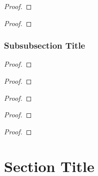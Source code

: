 \begin{thrm}
    \lipsum[1]
\end{thrm}

\begin{proof}
    \lipsum[1]
\end{proof}

\begin{coro}
    \lipsum[1]
\end{coro}

\begin{proof}
    \lipsum[1]
\end{proof}

\subsubsection{Subsubsection Title}

\begin{lemm}
    \lipsum[1]
\end{lemm}

\begin{proof}
    \lipsum[1]
\end{proof}

\begin{lemm}
    \lipsum[1]
\end{lemm}

\begin{proof}
    \lipsum[1]
\end{proof}

\begin{thrm}
    \lipsum[1]
\end{thrm}

\begin{proof}
    \lipsum[1]
\end{proof}

\begin{coro}
    \lipsum[1]
\end{coro}

\begin{proof}
    \lipsum[1]
\end{proof}

\begin{coro}
    \lipsum[1]
\end{coro}

\begin{proof}
    \lipsum[1]
\end{proof}

\section{Section Title}

